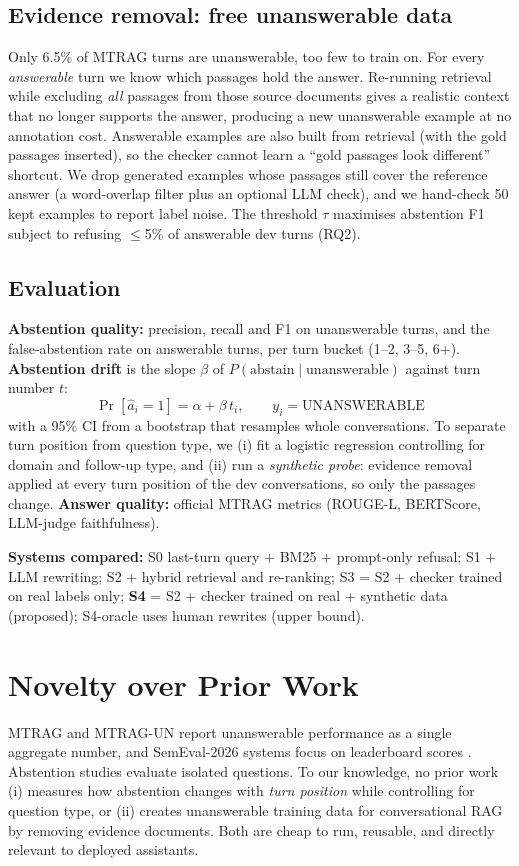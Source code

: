 \documentclass[10pt,twocolumn]{article}
\begin{document}
\subsection{Evidence removal: free unanswerable data}
Only 6.5\% of MTRAG turns are unanswerable, too few to train on. For every \emph{answerable} turn we know which passages hold the answer. Re-running retrieval while excluding \emph{all} passages from those source documents gives a realistic context that no longer supports the answer, producing a new unanswerable example at no annotation cost. Answerable examples are also built from retrieval (with the gold passages inserted), so the checker cannot learn a ``gold passages look different'' shortcut. We drop generated examples whose passages still cover the reference answer (a word-overlap filter plus an optional LLM check), and we hand-check 50 kept examples to report label noise. The threshold $\tau$ maximises abstention F1 subject to refusing $\le$5\% of answerable dev turns (RQ2).

\subsection{Evaluation}
\textbf{Abstention quality:} precision, recall and F1 on unanswerable turns, and the false-abstention rate on answerable turns, per turn bucket (1--2, 3--5, 6+). \textbf{Abstention drift} is the slope $\beta$ of $P(\text{abstain}\mid\text{unanswerable})$ against turn number $t$:
\[
\Pr[\hat a_i=1] = \alpha + \beta\, t_i ,\qquad y_i=\text{UNANSWERABLE}
\]
with a 95\% CI from a bootstrap that resamples whole conversations. To separate turn position from question type, we (i) fit a logistic regression controlling for domain and follow-up type, and (ii) run a \emph{synthetic probe}: evidence removal applied at every turn position of the dev conversations, so only the passages change. \textbf{Answer quality:} official MTRAG metrics (ROUGE-L, BERTScore, LLM-judge faithfulness).

\textbf{Systems compared:} S0 last-turn query + BM25 + prompt-only refusal; S1 + LLM rewriting; S2 + hybrid retrieval and re-ranking; S3 = S2 + checker trained on real labels only; \textbf{S4} = S2 + checker trained on real + synthetic data (proposed); S4-oracle uses human rewrites (upper bound).

\section{Novelty over Prior Work}
MTRAG and MTRAG-UN \cite{mtrag,mtragun} report unanswerable performance as a single aggregate number, and SemEval-2026 systems focus on leaderboard scores \cite{ails}. Abstention studies \cite{wen2025,feng} evaluate isolated questions. To our knowledge, no prior work (i) measures how abstention changes with \emph{turn position} while controlling for question type, or (ii) creates unanswerable training data for conversational RAG by removing evidence documents. Both are cheap to run, reusable, and directly relevant to deployed assistants.
\end{document}

